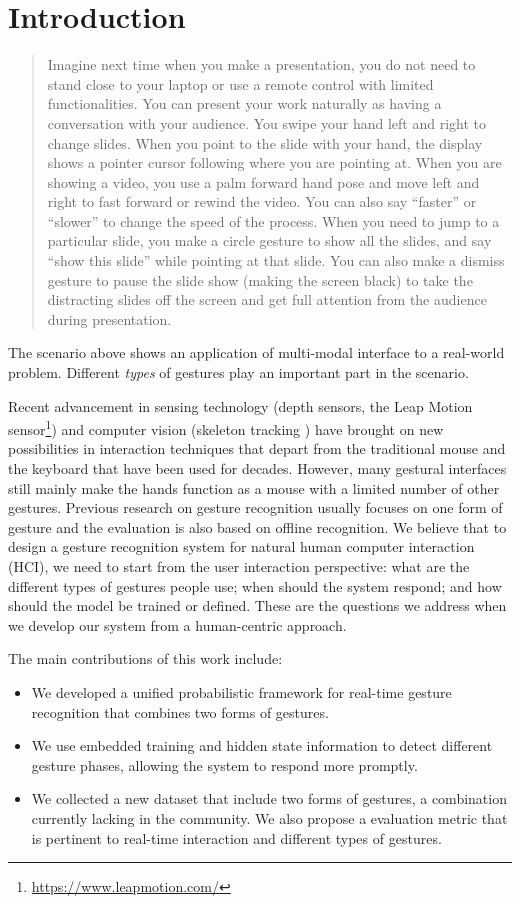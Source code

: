 \documentclass[conference]{IEEEtran}
\begin{document}
\section{Introduction}
\begin{quotation}
Imagine next time when you make a presentation, you do not need to stand close
to your laptop or use a remote control with limited functionalities. You can
present your work naturally as having a conversation with your audience. You
swipe your hand left and right to change slides. When you point to the slide
with your hand, the display shows a pointer cursor following where you are
pointing at. When you are showing a video,
you use a palm forward hand pose and move left and right to fast forward or
rewind the video. You can also say ``faster'' or ``slower'' to change the speed
of the process. When you need to jump to a particular slide, you make a circle
gesture to show all the slides, and say ``show this
slide'' while pointing at that slide. You can also make a dismiss gesture to
pause the slide show (making the screen black) to take the distracting slides off the
screen and get full attention from the audience during presentation.
\end{quotation}

The scenario above shows an application of multi-modal interface to a real-world
problem. Different \textit{types} of gestures play an important part in the
scenario. 

Recent advancement in sensing technology (depth sensors, the Leap Motion
sensor\footnote{\url{https://www.leapmotion.com/}}) and computer vision
(skeleton tracking \cite{shotton13}) have brought on new possibilities in interaction techniques that depart from the traditional mouse
and the keyboard that have been used for decades. However, many gestural
interfaces still mainly make the hands function as a mouse
with a limited number of other gestures. Previous research on gesture
recognition usually focuses on one form of gesture and the evaluation is also
based on offline recognition. We believe that to design a gesture
recognition system for natural human computer interaction (HCI), we need to
start from the user interaction perspective:
what are the different types of gestures people use;
when should the system respond; and how should the model be trained or defined.
These are the questions we address when we develop our system from a
human-centric approach.

The main contributions of this work include:
\begin{itemize}
  \item We developed a unified probabilistic framework for real-time gesture
  recognition that combines two forms of gestures.
  \item We use embedded training and hidden state information to detect
  different gesture phases, allowing the system to respond more promptly.
  \item We collected a new dataset that include two forms of gestures, a
  combination currently lacking in the community. We also propose a
  evaluation metric that is pertinent to real-time interaction and different types of gestures.
\end{itemize}
\end{document}
